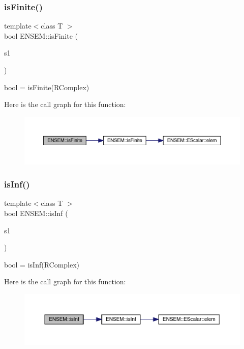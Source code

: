 \subsubsection{\texorpdfstring{isFinite()}{isFinite()}}
{\footnotesize\ttfamily template$<$class T $>$ \\
bool E\+N\+S\+E\+M\+::is\+Finite (\begin{DoxyParamCaption}\item[{const \mbox{\hyperlink{classENSEM_1_1RComplex}{R\+Complex}}$<$ T $>$ \&}]{s1 }\end{DoxyParamCaption})}



bool = is\+Finite(\+R\+Complex) 

Here is the call graph for this function\+:\nopagebreak
\begin{figure}[H]
\begin{center}
\leavevmode
\includegraphics[width=350pt]{da/dc7/group__rcomplex_ga3152e73aedd89eafdfab17e0cb0363b5_cgraph}
\end{center}
\end{figure}
\mbox{\label{group__rcomplex_gabf9e4d305784028c682bdf06201dba86}} 
\subsubsection{\texorpdfstring{isInf()}{isInf()}}
{\footnotesize\ttfamily template$<$class T $>$ \\
bool E\+N\+S\+E\+M\+::is\+Inf (\begin{DoxyParamCaption}\item[{const \mbox{\hyperlink{classENSEM_1_1RComplex}{R\+Complex}}$<$ T $>$ \&}]{s1 }\end{DoxyParamCaption})}



bool = is\+Inf(\+R\+Complex) 

Here is the call graph for this function\+:\nopagebreak
\begin{figure}[H]
\begin{center}
\leavevmode
\includegraphics[width=350pt]{da/dc7/group__rcomplex_gabf9e4d305784028c682bdf06201dba86_cgraph}
\end{center}
\end{figure}
\mbox{\label{group__rcomplex_ga909986b087edfa0819ffe4b76d00ed42}} 
